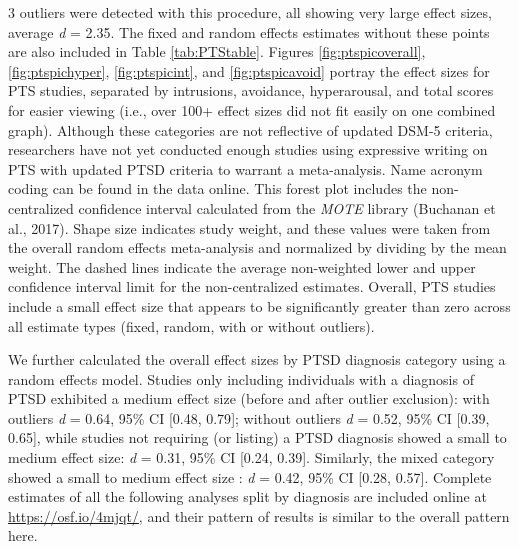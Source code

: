 \documentclass[,man]{apa6}
\begin{document}
3 outliers were detected with this procedure, all showing very large effect sizes, average \emph{d} = 2.35. The fixed and random effects estimates without these points are also included in Table \ref{tab:PTStable}. Figures \ref{fig:ptspicoverall}, \ref{fig:ptspichyper}, \ref{fig:ptspicint}, and \ref{fig:ptspicavoid} portray the effect sizes for PTS studies, separated by intrusions, avoidance, hyperarousal, and total scores for easier viewing (i.e., over 100+ effect sizes did not fit easily on one combined graph). Although these categories are not reflective of updated DSM-5 criteria, researchers have not yet conducted enough studies using expressive writing on PTS with updated PTSD criteria to warrant a meta-analysis. Name acronym coding can be found in the data online. This forest plot includes the non-centralized confidence interval calculated from the \emph{MOTE} library (Buchanan et al., 2017). Shape size indicates study weight, and these values were taken from the overall random effects meta-analysis and normalized by dividing by the mean weight. The dashed lines indicate the average non-weighted lower and upper confidence interval limit for the non-centralized estimates. Overall, PTS studies include a small effect size that appears to be significantly greater than zero across all estimate types (fixed, random, with or without outliers).

We further calculated the overall effect sizes by PTSD diagnosis category using a random effects model. Studies only including individuals with a diagnosis of PTSD exhibited a medium effect size (before and after outlier exclusion): with outliers \emph{d} = 0.64, 95\% CI {[}0.48, 0.79{]}; without outliers \emph{d} = 0.52, 95\% CI {[}0.39, 0.65{]}, while studies not requiring (or listing) a PTSD diagnosis showed a small to medium effect size: \emph{d} = 0.31, 95\% CI {[}0.24, 0.39{]}. Similarly, the mixed category showed a small to medium effect size : \emph{d} = 0.42, 95\% CI {[}0.28, 0.57{]}. Complete estimates of all the following analyses split by diagnosis are included online at \url{https://osf.io/4mjqt/}, and their pattern of results is similar to the overall pattern here.
\end{document}
